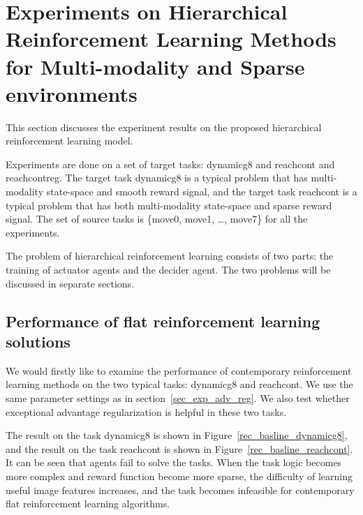 
\section{Experiments on Hierarchical Reinforcement Learning Methods for Multi-modality and Sparse environments}
This section discusses the experiment results on the proposed hierarchical reinforcement learning model.

Experiments are done on a set of target tasks: dynamicg8 and reachcont and reachcontreg. The target task dynamicg8 is a typical problem that has multi-modality state-space and smooth reward signal, and the target task reachcont is a typical problem that has both multi-modality state-space and sparse reward signal. The set of source tasks is  \{move0, move1, \dots, move7\} for all the experiments.

The problem of hierarchical reinforcement learning consists of two parts: the training of actuator agents and the decider agent. The two problems will be discussed in separate sections.

\subsection{Performance of flat reinforcement learning solutions}
We would firstly like to examine the performance of contemporary reinforcement learning methods on the two typical tasks: dynamicg8 and reachcont. We use the same parameter settings as in section~\ref{sec_exp_adv_reg}. We also test whether exceptional advantage regularization is helpful in these two tasks.

The result on the task dynamicg8 is shown in Figure~\ref{rec_basline_dynamicg8}, and the result on the task reachcont is shown in Figure~\ref{rec_basline_reachcont}. It can be seen that agents fail to solve the tasks. When the task logic becomes more complex and reward function become more sparse, the difficulty of learning useful image features increases, and the task becomes infeasible for contemporary flat reinforcement learning algorithms.

